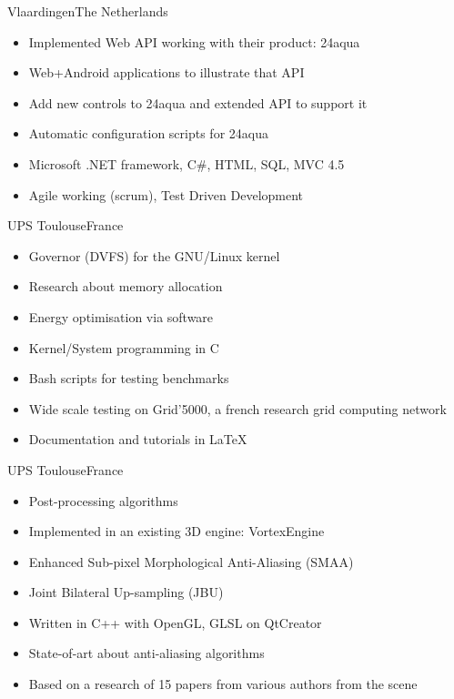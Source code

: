 \documentclass[a4paper,11pt]{moderncv}
\begin{document}
{Vlaardingen}{The Netherlands}
{
    \begin{itemize}
        \item Implemented Web API working with their product: 24aqua
        \item Web+Android applications to illustrate that API
        \item Add new controls to 24aqua and extended API to support it
        \item Automatic configuration scripts for 24aqua
        \item Microsoft .NET framework, C\#, HTML, SQL, MVC 4.5
        \item Agile working (scrum), Test Driven Development
    \end{itemize}
}

{UPS Toulouse}{France}
{
    \begin{itemize}
        \item Governor (DVFS) for the GNU/Linux kernel
        \item Research about memory allocation
        \item Energy optimisation via software
        \item Kernel/System programming in C
        \item Bash scripts for testing benchmarks
        \item Wide scale testing on Grid'5000, a french research grid computing network
        \item Documentation and tutorials in \LaTeX
    \end{itemize}
}

{UPS Toulouse}{France}
{
    \begin{itemize}
        \item Post-processing algorithms
        \item Implemented in an existing 3D engine: VortexEngine
        \item Enhanced Sub-pixel Morphological Anti-Aliasing (SMAA)
        \item Joint Bilateral Up-sampling (JBU)
        \item Written in C++ with OpenGL, GLSL on QtCreator
    \end{itemize}
    \begin{itemize}
        \item State-of-art about anti-aliasing algorithms
        \item Based on a research of 15 papers from various authors from the scene
    \end{itemize}
}
\end{document}
